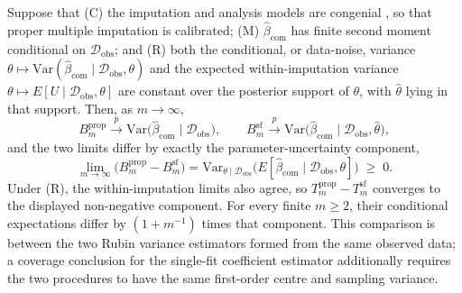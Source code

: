 \begin{proposition}\label{prop:improper-mi}
Suppose that (C) the imputation and analysis models are congenial \citep{meng1994multiple}, so that proper multiple imputation is calibrated; (M) $\hat{\beta}_{\mathrm{com}}$ has finite second moment conditional on $\mathcal{D}_{\mathrm{obs}}$; and (R) both the conditional, or data-noise, variance $\theta\mapsto\mathrm{Var}(\hat{\beta}_{\mathrm{com}}\mid\mathcal{D}_{\mathrm{obs}},\theta)$ and the expected within-imputation variance $\theta\mapsto E[U\mid\mathcal{D}_{\mathrm{obs}},\theta]$ are constant over the posterior support of $\theta$, with $\hat{\theta}$ lying in that support. Then, as $m\to\infty$,
\[
B_m^{\mathrm{prop}}\xrightarrow{p}\mathrm{Var}\bigl(\hat{\beta}_{\mathrm{com}}\mid\mathcal{D}_{\mathrm{obs}}\bigr),
\qquad
B_m^{\mathrm{sf}}\xrightarrow{p}\mathrm{Var}\bigl(\hat{\beta}_{\mathrm{com}}\mid\mathcal{D}_{\mathrm{obs}},\hat{\theta}\bigr),
\]
and the two limits differ by exactly the parameter-uncertainty component,
\[
\lim_{m\to\infty}\bigl(B_m^{\mathrm{prop}}-B_m^{\mathrm{sf}}\bigr)
=\mathrm{Var}_{\theta\mid\mathcal{D}_{\mathrm{obs}}}\!\bigl(E[\hat{\beta}_{\mathrm{com}}\mid\mathcal{D}_{\mathrm{obs}},\theta]\bigr)\;\ge\;0 .
\]
Under (R), the within-imputation limits also agree, so $T_m^{\mathrm{prop}}-T_m^{\mathrm{sf}}$ converges to the displayed non-negative component. For every finite $m\ge2$, their conditional expectations differ by $(1+m^{-1})$ times that component. This comparison is between the two Rubin variance estimators formed from the same observed data; a coverage conclusion for the single-fit coefficient estimator additionally requires the two procedures to have the same first-order centre and sampling variance.
\end{proposition}

